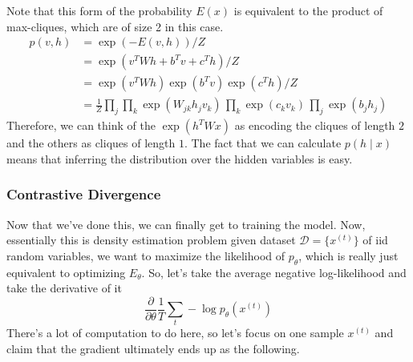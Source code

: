 \documentclass{article}
\begin{document}
  Note that this form of the probability $E(x)$ is equivalent to the product of max-cliques, which are of size 2 in this case. 
  \begin{align}
    p(v, h) & = \exp(-E(v, h)) / Z \\ 
            & = \exp(v^T W h + b^T v + c^T h) / Z \\
            & = \exp(v^T W h) \exp(b^T v) \exp (c^T h) / Z  \\
            & = \frac{1}{Z} \prod_j \prod_k \exp(W_{jk} h_j v_k) \, \prod_k \exp(c_k v_k) \, \prod_j \exp(b_j h_j)
  \end{align}
  Therefore, we can think of the $\exp(h^T W x)$ as encoding the cliques of length $2$ and the others as cliques of length $1$. The fact that we can calculate $p(h \mid x)$ means that inferring the distribution over the hidden variables is easy. 

  \subsubsection{Contrastive Divergence}

    Now that we've done this, we can finally get to training the model. Now, essentially this is density estimation problem given dataset $\mathcal{D} = \{x^{(t)}\}$ of iid random variables, we want to maximize the likelihood of $p_{\theta}$, which is really just equivalent to optimizing $E_{\theta}$. So, let's take the average negative log-likelihood and take the derivative of it
    \begin{equation}
      \frac{\partial}{\partial \theta} \frac{1}{T} \sum_t - \log p_{\theta} (x^{(t)})
    \end{equation}
    There's a lot of computation to do here, so let's focus on one sample $x^{(t)}$ and claim that the gradient ultimately ends up as the following. 
\end{document}
